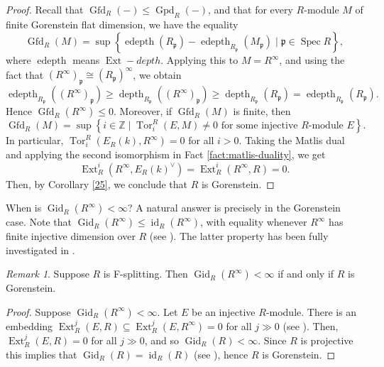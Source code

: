\documentclass[11pt,a4paper]{amsart}
\numberwithin{equation}{section}
\theoremstyle{definition}
\theoremstyle{remark}
\newtheorem{remark}[theorem]{Remark}
\newcommand{\id}{\operatorname{id}}
\newcommand{\Ext}{\operatorname{Ext}}
\begin{document}
\begin{proof}
	Recall that $\operatorname{Gfd}_R(-) \leq \operatorname{Gpd}_R(-)$, and that for every $R$-module $M$ of finite Gorenstein flat dimension, we have the equality
	\[
	\operatorname{Gfd}_R(M) = \sup \left\{ \operatorname{edepth}(R_{\mathfrak p}) - \operatorname{edepth}_{R_{\mathfrak p}}(M_{\mathfrak p}) \mid \mathfrak p \in \operatorname{Spec} R \right\},
	\]where $\operatorname{edepth}$ means $\Ext-depth$.
	Applying this to $M = R^\infty$, and using the fact that $(R^\infty)_{\mathfrak p} \cong (R_{\mathfrak p})^\infty$, we obtain
	\[
	\operatorname{edepth}_{R_{\mathfrak p}}((R^\infty)_{\mathfrak p}) 
	\geq \operatorname{depth}_{R_{\mathfrak p}}((R^\infty)_{\mathfrak p}) 
	\geq \operatorname{depth}_{R_{\mathfrak p}}(R_{\mathfrak p}) 
	= \operatorname{edepth}_{R_{\mathfrak p}}(R_{\mathfrak p}).
	\]
	Hence $\operatorname{Gfd}_R(R^\infty) \leq 0$.
	Moreover, if $\operatorname{Gfd}_R(M)$ is finite, then
	\[
	\operatorname{Gfd}_R(M) = \sup \left\{ i \in \mathbb{Z} \mid \operatorname{Tor}_i^R(E, M) \neq 0 \text{ for some injective } R\text{-module } E \right\}.
	\]
	In particular, $\operatorname{Tor}_i^R(E_R(k), R^\infty) = 0$ for all $i > 0$. Taking the Matlis dual and applying the second isomorphism in Fact \ref{fact:matlis-duality}, we get
	\[
	\operatorname{Ext}_R^i(R^\infty, E_R(k)^\vee) 
	= \operatorname{Ext}_R^i(R^\infty, R) = 0.
	\]
	Then, by Corollary \ref{25}, we conclude that $R$ is Gorenstein.
\end{proof}


	When is $\operatorname{Gid}_R(R^\infty) < \infty$?
A natural answer is precisely in the Gorenstein case. Note that $\operatorname{Gid}_R(R^\infty) \leq \operatorname{id}_R(R^\infty)$, with equality whenever $R^\infty$ has finite injective dimension over $R$ (see \cite[Proposition 3.10]{Totally}). The latter property has been fully investigated   in \cite{Ryo}.
 
 \begin{remark}
Suppose $R$ is F-splitting. Then $\operatorname{Gid}_R(R^\infty) < \infty$ if and only if $R$ is Gorenstein. 
 \end{remark}


\begin{proof}Suppose $\operatorname{Gid}_R(R^\infty) < \infty$.
Let $E$ be an injective $R$-module. There is an embedding $\Ext^j_R(E,R)\subseteq   \Ext^j_R(E,R^\infty)=0$ for all $j\gg 0$ (see \cite[Corollary 3.7]{Totally}). Then, $\Ext^j_R(E,R)=0$ for all $j\gg 0$, and so $\operatorname{Gid}_R(R) < \infty$. Since $R$ is projective this implies that $\operatorname{Gid}_R(R)=\id_R(R)$ (see \cite[Proposition 3.11]{Totally}), hence
 $R$ is Gorenstein.
\end{proof}
\end{document}
